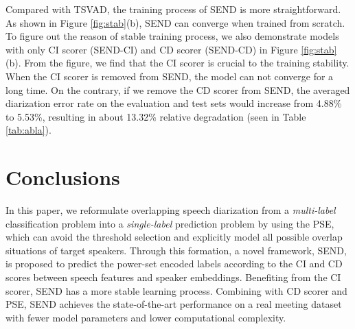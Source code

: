 \documentclass[a4paper]{article}
\begin{document}
Compared with TSVAD, the training process of SEND is more straightforward.
As shown in Figure \ref{fig:stab}(b), SEND can converge when trained from scratch.
To figure out the reason of stable training process, we also demonstrate models with only CI scorer (SEND-CI) and CD scorer (SEND-CD) in Figure \ref{fig:stab}(b).
From the figure, we find that the CI scorer is crucial to the training stability.
When the CI scorer is removed from SEND, the model can not converge for a long time.
On the contrary, if we remove the CD scorer from SEND, the averaged diarization error rate on the evaluation and test sets would increase from 4.88\% to 5.53\%, resulting in about 13.32\% relative degradation (seen in Table \ref{tab:abla}).
 
\section{Conclusions}
In this paper, we reformulate overlapping speech diarization from a \emph{multi-label} classification problem into a \emph{single-label} prediction problem by using the PSE, which can avoid the threshold selection and explicitly model all possible overlap situations of target speakers. Through this formation, a novel framework, SEND, is proposed to predict the power-set encoded labels according to the CI and CD scores between speech features and speaker embeddings.
Benefiting from the CI scorer, SEND has a more stable learning process.
Combining with CD scorer and PSE, SEND achieves the state-of-the-art performance on a real meeting dataset with fewer model parameters and lower computational complexity.





\end{document}
